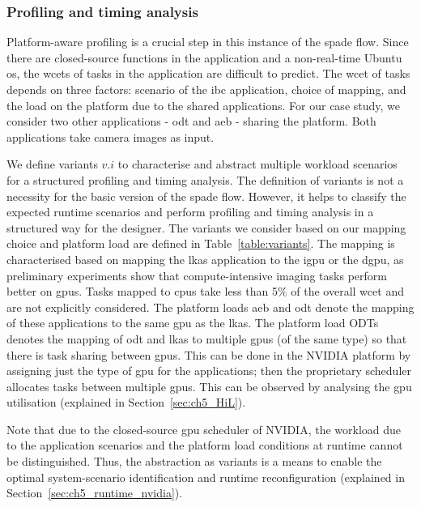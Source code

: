 \subsubsection{Profiling and timing analysis}
Platform-aware profiling is a crucial step in this instance of the \gls{spade} flow. 
Since there are closed-source functions in the application and a non-real-time Ubuntu \gls{os}, the \glspl{wcet} of tasks in the application are difficult to predict. The \gls{wcet} of tasks depends on three factors: scenario of the \gls{ibc} application, choice of mapping, and the load on the platform due to the shared applications. For our case study, we consider two other applications - \gls{odt} and \gls{aeb} - sharing the platform. Both applications take camera images as input. 

We define variants $v.i$ to characterise and abstract multiple workload scenarios for a structured profiling and timing analysis.
The definition of variants is not a necessity for the basic version of the \gls{spade} flow. However, it helps to classify the expected runtime scenarios and perform profiling and timing analysis in a structured way for the designer.
The variants we consider based on our mapping choice and platform load are defined in Table~\ref{table:variants}. 
The mapping is characterised based on mapping the \gls{lkas} application to the \gls{igpu} or the \gls{dgpu}, as preliminary experiments show that compute-intensive imaging tasks perform better on \glspl{gpu}. Tasks mapped to \glspl{cpu} take less than 5\% of the overall \gls{wcet} and are not explicitly considered.
The platform loads \gls{aeb} and \gls{odt} denote the mapping of these applications to the same \gls{gpu} as the \gls{lkas}. The platform load ODTs denotes the mapping of \gls{odt} and \gls{lkas} to multiple \glspl{gpu} (of the same type) so that there is task sharing between \glspl{gpu}. This can be done in the NVIDIA platform by assigning just the type of \gls{gpu} for the applications; then the proprietary scheduler allocates tasks between multiple \glspl{gpu}. This can be observed by analysing the \gls{gpu} utilisation (explained in Section~\ref{sec:ch5_HiL}).

Note that due to the closed-source \gls{gpu} scheduler of NVIDIA, the workload due to the application scenarios and the platform load conditions at runtime cannot be distinguished. 
Thus, the abstraction as variants is a means to enable the optimal system-scenario identification and runtime reconfiguration (explained in Section~\ref{sec:ch5_runtime_nvidia}). 

